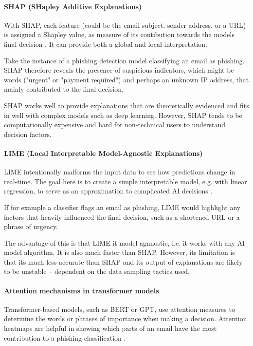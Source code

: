 \paragraph{SHAP (SHapley Additive Explanations)}
With SHAP, each feature (could be the email subject, sender address, or a URL) is assigned a Shapley value, as measure of its contibution towards the models final decision \citep{lundberg2017unified}. It can provide both a global and local interpretation.\newline

\noindent Take the instance of a phishing detection model classifying an email as phishing. SHAP therefore reveals the presence of suspicious indicators, which might be words ("urgent" or "payment required") and perhaps an unknown IP address, that mainly contributed to the final decision.\newline

\noindent SHAP works well to provide explanations that are theoretically evidenced and fits in well with complex models such as deep learning. However, SHAP tends to be computationally expensive and hard for non-technical users to understand decision factors.

\paragraph{LIME (Local Interpretable Model-Agnostic Explanations)}
LIME intentionally malforms the input data to see how predictions change in real-time. The goal here is to create a simple interpretable model, e.g. with linear regression, to serve as an approximation to complicated AI decisions \citep{ribeiro2016model}.\newline

\noindent If for example a classifier flags an email as phishing, LIME would highlight any factors that heavily influenced the final decision, such as a shortened URL or a phrase of urgency.\newline

\noindent The advantage of this is that LIME it model agnnostic, i.e. it works with any AI model algorithm. It is also much faster than SHAP. However, its limitation is that its much less accurate than SHAP and its output of explanations are likely to be unstable -- dependent on the data sampling tactics used.

\paragraph{Attention mechanisms in transformer models}
Transformer-based models, such as BERT or GPT, use attention measures to determine the words or phrases of importance when making a decision. Attention heatmaps are helpful in showing which parts of an email have the most contribution to a phishing classification \citep{hadi2024adaptive}.\newline

